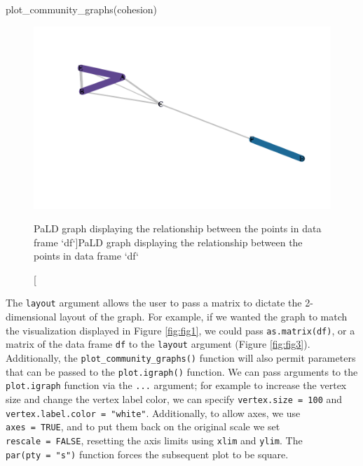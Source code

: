 \begin{Schunk}
\begin{Sinput}
plot_community_graphs(cohesion)
\end{Sinput}
\begin{figure}
\includegraphics{dagostino-mcgowan_files/figure-latex/fig2-1} \caption[PaLD graph displaying the relationship between the points in data frame `df`]{PaLD graph displaying the relationship between the points in data frame `df`}\label{fig:fig2}
\end{figure}
\end{Schunk}

The \texttt{layout} argument allows the user to pass a matrix to dictate
the 2-dimensional layout of the graph. For example, if we wanted the
graph to match the visualization displayed in Figure \ref{fig:fig1}, we
could pass \texttt{as.matrix(df)}, or a matrix of the data frame
\texttt{df} to the \texttt{layout} argument (Figure \ref{fig:fig3}).
Additionally, the \texttt{plot\_community\_graphs()} function will also
permit parameters that can be passed to the \texttt{plot.igraph()}
function. We can pass arguments to the \texttt{plot.igraph} function via
the \texttt{...} argument; for example to increase the vertex size and
change the vertex label color, we can specify
\texttt{vertex.size\ =\ 100} and
\texttt{vertex.label.color\ =\ "white"}. Additionally, to allow axes, we
use \texttt{axes\ =\ TRUE}, and to put them back on the original scale
we set \texttt{rescale\ =\ FALSE}, resetting the axis limits using
\texttt{xlim} and \texttt{ylim}. The \texttt{par(pty\ =\ "s")} function
forces the subsequent plot to be square.

